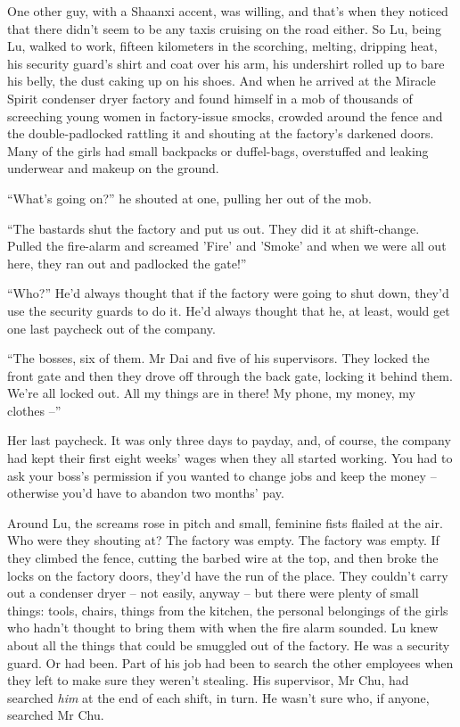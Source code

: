 One other guy, with a Shaanxi accent, was willing, and that's when
they noticed that there didn't seem to be any taxis cruising on the
road either. So Lu, being Lu, walked to work, fifteen kilometers in
the scorching, melting, dripping heat, his security guard's shirt
and coat over his arm, his undershirt rolled up to bare his belly,
the dust caking up on his shoes. And when he arrived at the Miracle
Spirit condenser dryer factory and found himself in a mob of
thousands of screeching young women in factory-issue smocks,
crowded around the fence and the double-padlocked rattling it and
shouting at the factory's darkened doors. Many of the girls had
small backpacks or duffel-bags, overstuffed and leaking underwear
and makeup on the ground.

``What's going on?'' he shouted at one, pulling her out of the mob.

``The bastards shut the factory and put us out. They did it at
shift-change. Pulled the fire-alarm and screamed 'Fire' and 'Smoke'
and when we were all out here, they ran out and padlocked the
gate!''

``Who?'' He'd always thought that if the factory were going to shut
down, they'd use the security guards to do it. He'd always thought
that he, at least, would get one last paycheck out of the company.

``The bosses, six of them. Mr Dai and five of his supervisors. They
locked the front gate and then they drove off through the back
gate, locking it behind them. We're all locked out. All my things
are in there! My phone, my money, my clothes --''

Her last paycheck. It was only three days to payday, and, of
course, the company had kept their first eight weeks' wages when
they all started working. You had to ask your boss's permission if
you wanted to change jobs and keep the money -- otherwise you'd
have to abandon two months' pay.

Around Lu, the screams rose in pitch and small, feminine fists
flailed at the air. Who were they shouting at? The factory was
empty. The factory was empty. If they climbed the fence, cutting
the barbed wire at the top, and then broke the locks on the factory
doors, they'd have the run of the place. They couldn't carry out a
condenser dryer -- not easily, anyway -- but there were plenty of
small things: tools, chairs, things from the kitchen, the personal
belongings of the girls who hadn't thought to bring them with when
the fire alarm sounded. Lu knew about all the things that could be
smuggled out of the factory. He was a security guard. Or had been.
Part of his job had been to search the other employees when they
left to make sure they weren't stealing. His supervisor, Mr Chu,
had searched \emph{him} at the end of each shift, in turn. He
wasn't sure who, if anyone, searched Mr Chu.

